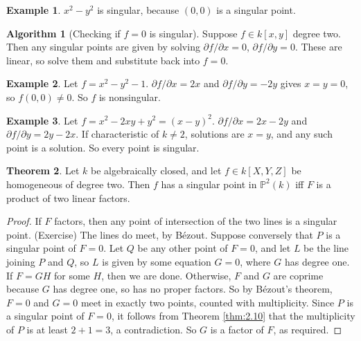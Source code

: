 \documentclass{article}
\renewcommand{\P}{\mathbb{P}}
\newcommand{\rb}[1]{\left( #1 \right)}
\renewcommand{\sb}[1]{\left[ #1 \right]}
\theoremstyle{definition}\newtheorem{definition}{Definition}[section]
\theoremstyle{definition}\newtheorem{remark}[definition]{Remark}
\theoremstyle{definition}\newtheorem*{example}{Example}
\theoremstyle{definition}\newtheorem*{note}{Note}
\newtheorem{theorem}[definition]{Theorem}
\newtheorem{algorithm}[definition]{Algorithm}
\begin{document}
\begin{example}
$ x^2 - y^2 $ is singular, because $ \rb{0, 0} $ is a singular point.
\end{example}

\begin{algorithm}[Checking if $ f = 0 $ is singular]
Suppose $ f \in k\sb{x, y} $ degree two. Then any singular points are given by solving $ \partial f / \partial x = 0 $, $ \partial f / \partial y = 0 $. These are linear, so solve them and substitute back into $ f = 0 $.
\end{algorithm}

\begin{example}
Let $ f = x^2 - y^2 - 1 $. $ \partial f / \partial x = 2x $ and $ \partial f / \partial y = -2y $ gives $ x = y = 0 $, so $ f\rb{0, 0} \ne 0 $. So $ f $ is nonsingular.
\end{example}

\begin{example}
Let $ f = x^2 - 2xy + y^2 = \rb{x - y}^2 $. $ \partial f / \partial x = 2x - 2y $ and $ \partial f / \partial y = 2y - 2x $. If characteristic of $ k \ne 2 $, solutions are $ x = y $, and any such point is a solution. So every point is singular.
\end{example}

\begin{theorem}
Let $ k $ be algebraically closed, and let $ f \in k\sb{X, Y, Z} $ be homogeneous of degree two. Then $ f $ has a singular point in $ \P^2\rb{k} $ iff $ F $ is a product of two linear factors.
\end{theorem}

\begin{proof}
If $ F $ factors, then any point of intersection of the two lines is a singular point. (Exercise) The lines do meet, by Bézout. Suppose conversely that $ P $ is a singular point of $ F = 0 $. Let $ Q $ be any other point of $ F = 0 $, and let $ L $ be the line joining $ P $ and $ Q $, so $ L $ is given by some equation $ G = 0 $, where $ G $ has degree one. If $ F = GH $ for some $ H $, then we are done. Otherwise, $ F $ and $ G $ are coprime because $ G $ has degree one, so has no proper factors. So by Bézout's theorem, $ F = 0 $ and $ G = 0 $ meet in exactly two points, counted with multiplicity. Since $ P $ is a singular point of $ F = 0 $, it follows from Theorem \ref{thm:2.10} that the multiplicity of $ P $ is at least $ 2 + 1 = 3 $, a contradiction. So $ G $ is a factor of $ F $, as required.
\end{proof}
\end{document}

